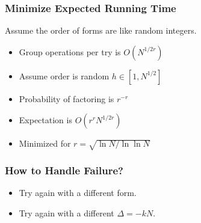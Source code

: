 \documentclass{beamer}
\begin{document}
\begin{frame}
\frametitle{Minimize Expected Running Time}
Assume the order of forms are like random integers.

\begin{itemize}
\item<2-> Group operations per try is $O(N^{1/2r})$
\item<3-> Assume order is random $h \in [1, N^{1/2}]$
\item<4-> Probability of factoring is $r^{-r}$
\item<5-> Expectation is $O(r^r N^{1/2r})$
\item<6-> Minimized for $r = \sqrt{\ln N / \ln \ln N}$
\end{itemize}
\end{frame}


\begin{frame}
\frametitle{How to Handle Failure?}
\begin{itemize}
\item Try again with a different form.
\item Try again with a different $\Delta = -kN$.
\end{itemize}
\end{frame}

\end{document}
